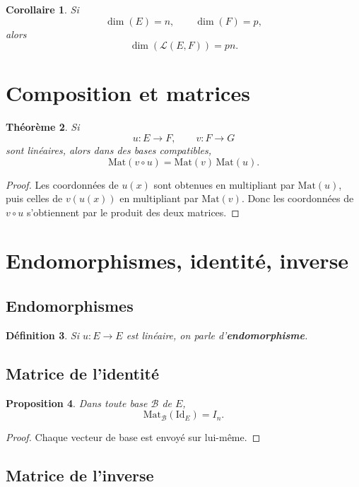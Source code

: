 \documentclass[11pt,a4paper]{article}
\newtheorem{definition}{Définition}[section]
\newtheorem{theoreme}[definition]{Théorème}
\newtheorem{proposition}[definition]{Proposition}
\newtheorem{corollaire}[definition]{Corollaire}
\theoremstyle{remark}
\newcommand{\id}{\mathrm{Id}}
\newcommand{\Lin}{\mathcal{L}}
\begin{document}
\begin{corollaire}
Si
\[
\dim(E)=n,\qquad \dim(F)=p,
\]
alors
\[
\dim(\Lin(E,F))=pn.
\]
\end{corollaire}

\section{Composition et matrices}

\begin{theoreme}
Si
\[
u:E\to F,\qquad v:F\to G
\]
sont linéaires, alors dans des bases compatibles,
\[
\mathrm{Mat}(v\circ u)=\mathrm{Mat}(v)\,\mathrm{Mat}(u).
\]
\end{theoreme}

\begin{proof}
Les coordonnées de \(u(x)\) sont obtenues en multipliant par \(\mathrm{Mat}(u)\), puis celles de \(v(u(x))\) en multipliant par \(\mathrm{Mat}(v)\). Donc les coordonnées de \(v\circ u\) s’obtiennent par le produit des deux matrices.
\end{proof}

\section{Endomorphismes, identité, inverse}

\subsection{Endomorphismes}

\begin{definition}
Si \(u:E\to E\) est linéaire, on parle d’\textbf{endomorphisme}.
\end{definition}

\subsection{Matrice de l’identité}

\begin{proposition}
Dans toute base \(\mathcal B\) de \(E\),
\[
\mathrm{Mat}_{\mathcal B}(\id_E)=I_n.
\]
\end{proposition}

\begin{proof}
Chaque vecteur de base est envoyé sur lui-même.
\end{proof}

\subsection{Matrice de l’inverse}
\end{document}
